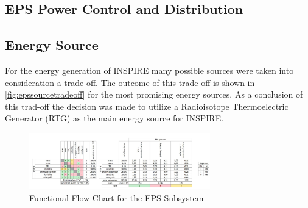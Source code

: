 \subsection{EPS Power Control and Distribution}

\subsection{Energy Source}
For the energy generation of INSPIRE many possible sources were taken into consideration a trade-off. The outcome of this trade-off is shown in \autoref{fig:epssourcetradeoff} for the most promising energy sources. As a conclusion of this trad-off the decision was made to utilize a Radioisotope Thermoelectric Generator (RTG) as the main energy source for INSPIRE.



\begin{figure}[htb]
{\centering
\includegraphics[width=0.7\textwidth]{Media/epssourcetradeoff}
\caption{Functional Flow Chart for the EPS Subsystem}
\label{fig:epssourcetradeoff}
}
\end{figure}

